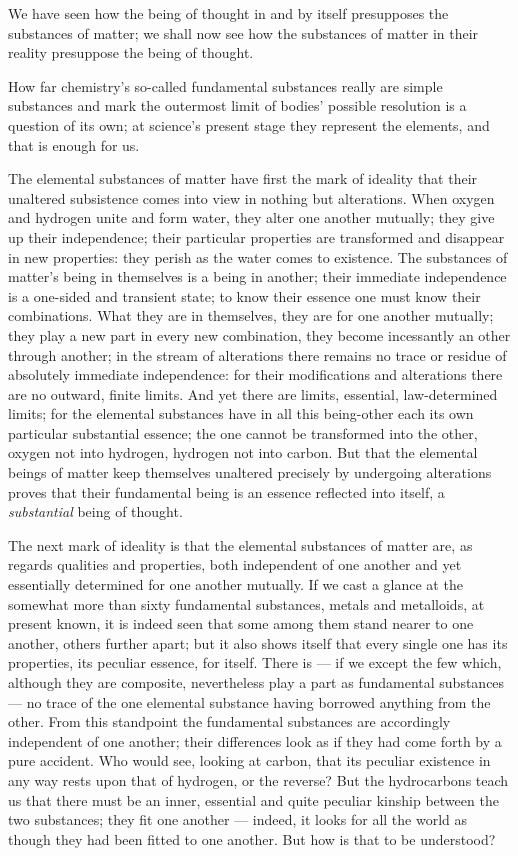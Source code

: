 \documentclass[12pt,a4paper]{book}
\begin{document}
We have seen how the being of thought in and by itself presupposes the substances of matter; we shall now see how
the substances of matter in their reality presuppose the being of thought.

How far chemistry's so-called fundamental substances really are simple substances and mark the outermost limit of
bodies' possible resolution is a question of its own; at science's present stage they represent the elements, and
that is enough for us.

The elemental substances of matter have first the mark of ideality that their unaltered subsistence comes into view
in nothing but alterations. When oxygen and hydrogen unite and form water, they alter one another mutually; they
give up their independence; their particular
properties are transformed and disappear in new properties: they perish as the water comes to existence. The
substances of matter's being in themselves is a being in another; their immediate independence is a one-sided and
transient state; to know their essence one must know their combinations. What they are in themselves, they are for
one another mutually; they play a new part in every new combination, they become incessantly an other through
another; in the stream of alterations there remains no trace or residue of absolutely immediate independence: for
their modifications and alterations there are no outward, finite limits. And yet there are limits, essential,
law-determined limits; for the elemental substances have in all this being-other each its own particular substantial
essence; the one cannot be transformed into the other, oxygen not into hydrogen, hydrogen not into carbon. But that
the elemental beings of matter keep themselves unaltered precisely by undergoing alterations proves that their
fundamental being is an essence reflected into itself, a \emph{substantial} being of thought.

The next mark of ideality is that the elemental substances of matter are, as regards qualities and properties, both
independent of one another and yet essentially determined for one another mutually. If we cast a glance at the
somewhat more than sixty fundamental substances, metals and metalloids, at present known, it is indeed seen that
some among them stand nearer to one another, others further apart; but it also shows itself that every single one
has its properties, its peculiar essence, for itself. There is --- if we except the few which, although they are
composite, nevertheless play a part as fundamental substances --- no trace of the one elemental substance having
borrowed anything from the other. From this standpoint the fundamental substances are accordingly independent of one
another; their differences look as if they had come forth by a pure accident. Who would see, looking at carbon, that
its peculiar existence in any way rests upon
that of hydrogen, or the reverse? But the hydrocarbons teach us that there must be an inner, essential and quite
peculiar kinship between the two substances; they fit one another --- indeed, it looks for all the world as though
they had been fitted to one another. But how is that to be understood?
\end{document}
